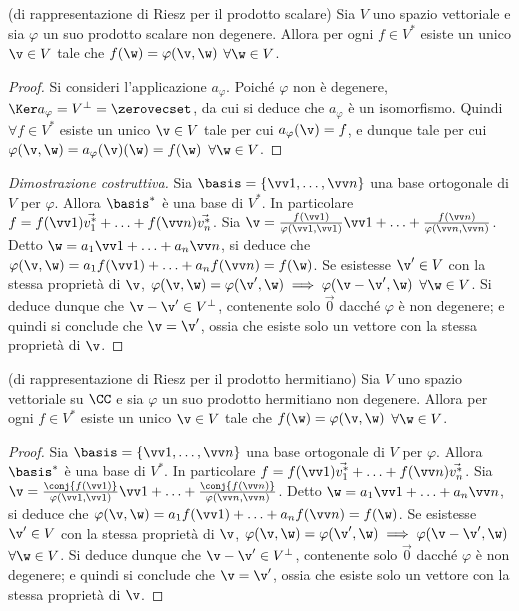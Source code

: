 \documentclass[11pt]{article}
\begin{document}
	\hr	
	
	\begin{theorem} (di rappresentazione di Riesz per il prodotto scalare) 
		Sia $V$ uno spazio vettoriale e sia $\varphi$ un suo prodotto scalare
		non degenere. Allora per ogni $f \in V^*$ esiste un unico $\v \in V$ tale che
		$f(\w) = \varphi(\v, \w)$ $\forall \w \in V$.
	\end{theorem}

	\begin{proof}
		Si consideri l'applicazione $a_\varphi$. Poiché $\varphi$ non è degenere, $\Ker a_\varphi = V^\perp = \zerovecset$, da cui si deduce che $a_\varphi$ è un isomorfismo. Quindi $\forall f \in V^*$ esiste
		un unico $\v \in V$ tale per cui $a_\varphi(\v) = f$, e dunque tale per cui $\varphi(\v, \w) = a_\varphi(\v)(\w) = f(\w)$ $\forall \w \in V$.
	\end{proof}
	
	\begin{proof}[Dimostrazione costruttiva]
		Sia $\basis = \{ \vv 1, \ldots, \vv n \}$ una base ortogonale di $V$ per $\varphi$. Allora $\basis^*$ è una base di $V^*$. In
		particolare $f = f(\vv 1) \vec{v_1^*} + \ldots + f(\vv n) \vec{v_n^*}$. Sia $\v = \frac{f(\vv 1)}{\varphi(\vv 1, \vv 1)} \vv 1 + \ldots + \frac{f(\vv n)}{\varphi(\vv n, \vv n)}$. Detto $\w = a_1 \vv 1 + \ldots + a_n \vv n$,
		si deduce che $\varphi(\v, \w) = a_1 f(\vv 1) + \ldots + a_n f(\vv n) = f(\w)$. Se esistesse $\v' \in V$ con
		la stessa proprietà di $\v$, $\varphi(\v, \w) = \varphi(\v', \w) \implies \varphi(\v - \v', \w)$ $\forall \w \in V$. Si deduce dunque che $\v - \v' \in V^\perp$, contenente solo $\vec 0$ dacché $\varphi$ è non degenere;
		e quindi si conclude che $\v = \v'$, ossia che esiste solo un vettore con la stessa proprietà di $\v$.
	\end{proof}

	\begin{theorem} (di rappresentazione di Riesz per il prodotto hermitiano)
		Sia $V$ uno spazio vettoriale su $\CC$ e sia $\varphi$ un suo prodotto hermitiano non
		degenere. Allora per ogni $f \in V^*$ esiste un unico $\v \in V$ tale che
		$f(\w) = \varphi(\v, \w)$ $\forall \w \in V$.
	\end{theorem}

	\begin{proof}
		Sia $\basis = \{ \vv 1, \ldots, \vv n \}$ una base ortogonale di $V$ per $\varphi$. Allora $\basis^*$ è una base di $V^*$. In
		particolare $f = f(\vv 1) \vec{v_1^*} + \ldots + f(\vv n) \vec{v_n^*}$. Sia $\v = \frac{\conj{f(\vv 1)}}{\varphi(\vv 1, \vv 1)} \vv 1 + \ldots + \frac{\conj{f(\vv n)}}{\varphi(\vv n, \vv n)}$. Detto $\w = a_1 \vv 1 + \ldots + a_n \vv n$,
		si deduce che $\varphi(\v, \w) = a_1 f(\vv 1) + \ldots + a_n f(\vv n) = f(\w)$. Se esistesse $\v' \in V$ con
		la stessa proprietà di $\v$, $\varphi(\v, \w) = \varphi(\v', \w) \implies \varphi(\v - \v', \w)$ $\forall \w \in V$. Si deduce dunque che $\v - \v' \in V^\perp$, contenente solo $\vec 0$ dacché $\varphi$ è non degenere;
		e quindi si conclude che $\v = \v'$, ossia che esiste solo un vettore con la stessa proprietà di $\v$.
	\end{proof}
\end{document}
